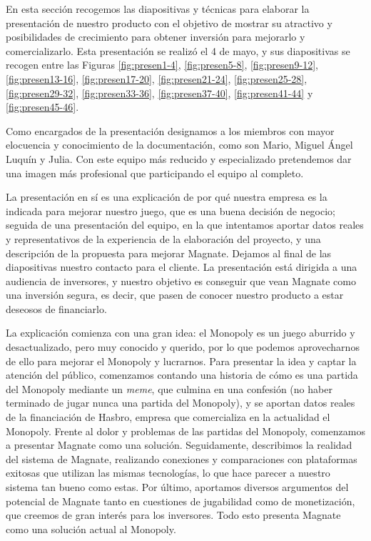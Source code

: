 En esta sección recogemos las diapositivas y técnicas para elaborar la presentación
de nuestro producto con el objetivo de mostrar su atractivo y posibilidades
de crecimiento para obtener inversión para mejorarlo y comercializarlo.
Esta presentación se realizó el 4 de mayo, y sus diapositivas se recogen entre las Figuras
\ref{fig:presen1-4},
\ref{fig:presen5-8},
\ref{fig:presen9-12},
\ref{fig:presen13-16},
\ref{fig:presen17-20},
\ref{fig:presen21-24},
\ref{fig:presen25-28},
\ref{fig:presen29-32},
\ref{fig:presen33-36},
\ref{fig:presen37-40},
\ref{fig:presen41-44} y
\ref{fig:presen45-46}.

Como encargados de la presentación designamos a los miembros con mayor elocuencia y
conocimiento de la documentación, como son Mario, Miguel Ángel Luquín y Julia.
Con este equipo más reducido y especializado pretendemos dar una imagen más profesional
que participando el equipo al completo.

La presentación en sí es una explicación de por qué nuestra empresa es la
indicada para mejorar nuestro juego, que es una buena decisión de negocio; 
seguida de una presentación del equipo, en la que intentamos aportar datos
reales y representativos de la experiencia de la elaboración del proyecto,
y una descripción de la propuesta para mejorar Magnate.
Dejamos al final de las diapositivas nuestro contacto para el cliente.
La presentación está dirigida a una audiencia de inversores, y nuestro objetivo
es conseguir que vean Magnate como una inversión segura, es decir, que pasen de
conocer nuestro producto a estar deseosos de financiarlo.

La explicación comienza con una gran idea: el Monopoly es un juego aburrido y 
desactualizado, pero muy conocido y querido, por lo que podemos aprovecharnos
de ello para mejorar el Monopoly y lucrarnos. Para presentar la idea y captar
la atención del público, comenzamos contando una historia de cómo es una
partida del Monopoly mediante un \textit{meme}, que culmina en una confesión
(no haber terminado de jugar nunca una partida del Monopoly), y se aportan
datos reales de la financiación de Hasbro, empresa que comercializa en la 
actualidad el Monopoly. Frente al dolor y problemas de las partidas del
Monopoly, comenzamos a presentar Magnate como una solución. Seguidamente,
describimos la realidad del sistema de Magnate, realizando conexiones y
comparaciones con plataformas exitosas que utilizan las mismas tecnologías,
lo que hace parecer a nuestro sistema tan bueno como estas. Por último,
aportamos diversos argumentos del potencial de Magnate tanto en cuestiones
de jugabilidad como de monetización, que creemos de gran interés para los 
inversores. Todo esto presenta Magnate como una solución actual al Monopoly.

